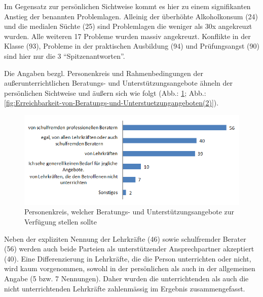 \noindent
Im Gegensatz zur persönlichen Sichtweise kommt es hier zu einem signifikanten Anstieg der benannten Problemlagen. Alleinig der überhöhte Alkoholkonsum (24) und die medialen Süchte (25) sind Problemlagen die weniger als 30x angekreuzt wurden. Alle weiteren 17 Probleme wurden massiv angekreuzt. Konflikte in der Klasse (93), Probleme in der praktischen Ausbildung (94) und Prüfungsangst (90) sind hier nur die 3 "`Spitzenantworten"'.

Die Angaben bezgl. Personenkreis und Rahmenbedingungen der außerunterrichtlichen Beratungs- und Unterstützungsangebote ähneln der persönlichen Sichtweise und äußern sich wie folgt (Abb.: \ref{fig:Personenkreis-fuer-unterstuetzungsangebote}; Abb.: \ref{fig:Erreichbarkeit-von-Beratungs-und-Unterstuetzungangeboten(2)}). 

\begin{figure}[ht]
	\centering
		\includegraphics[width=1.0\textwidth]{images/Personenkreis-fuer-unterstuetzungsangebote.png}
	\caption{Personenkreis, welcher Beratungs- und Unterstützungsangebote zur Verfügung stellen sollte}
	\label{fig:Personenkreis-fuer-unterstuetzungsangebote}
\end{figure}

\noindent
Neben der expliziten Nennung der Lehrkräfte (46) sowie schulfremder Berater (56) werden auch beide Parteien als unterstützender Ansprechpartner akzeptiert (40). Eine Differenzierung in Lehrkräfte, die die Person unterrichten oder nicht, wird kaum vorgenommen, sowohl in der persönlichen als auch in der allgemeinen Angabe (5 bzw. 7 Nennungen). Daher wurden die unterrichtenden als auch die nicht unterrichtenden Lehrkräfte zahlenmässig im Ergebnis zusammengefasst.

